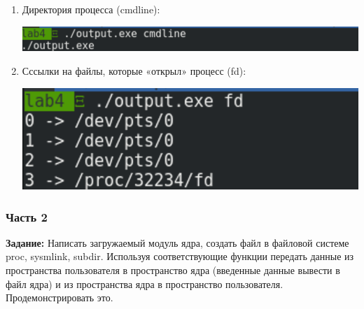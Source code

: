 \documentclass[a4paper,14pt]{extreport} %
\begin{document}
\begin{enumerate}
\item Директория процесса (cmdline):

\includegraphics[scale=0.45]{images/cmdline}

\item Сссылки на файлы, которые «открыл» процесс (fd):

\includegraphics[scale=0.45]{images/fd}

\end{enumerate}

\newpage

\subsubsection{Часть 2}

\hfill

\textbf{Задание: } Написать загружаемый модуль ядра, создать файл в файловой системе proc, sysmlink, subdir. Используя соответствующие функции передать данные из пространства пользователя в пространство ядра (введенные данные вывести в файл ядра) и из пространства ядра в пространство пользователя. Продемонстрировать это.
\end{document}
